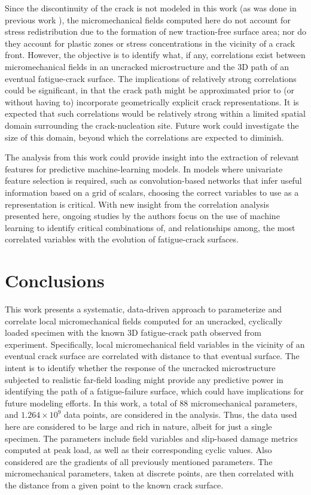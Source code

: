 Since the discontinuity of the crack is not modeled in this work (as was done in previous work \cite{spear2016}), the micromechanical fields computed here do not account for stress redistribution due to the formation of new traction-free surface area; nor do they account for plastic zones or stress concentrations in the vicinity of a crack front. However, the objective is to identify what, if any, correlations exist between micromechanical fields in an uncracked microstructure and the 3D path of an eventual fatigue-crack surface. The implications of relatively strong correlations could be significant, in that the crack path might be approximated prior to (or without having to) incorporate geometrically explicit crack representations. It is expected that such correlations would be relatively strong within a limited spatial domain surrounding the crack-nucleation site. Future work could investigate the size of this domain, beyond which the correlations are expected to diminish. 

The analysis from this work could provide insight into the extraction of relevant features for predictive machine-learning models. In models where univariate feature selection is required, such as convolution-based networks that infer useful information based on a grid of scalars, choosing the correct variables to use as a representation is critical. With new insight from the correlation analysis presented here, ongoing studies by the authors focus on the use of machine learning to identify critical combinations of, and relationships among, the most correlated variables with the evolution of fatigue-crack surfaces.

\section{Conclusions}
This work presents a systematic, data-driven approach to parameterize and correlate local micromechanical fields computed for an uncracked, cyclically loaded specimen with the known 3D fatigue-crack path observed from experiment. Specifically, local micromechanical field variables in the vicinity of an eventual crack surface are correlated with distance to that eventual surface. The intent is to identify whether the response of the uncracked microstructure subjected to realistic far-field loading might provide any predictive power in identifying the path of a fatigue-failure surface, which could have implications for future modeling efforts. In this work, a total of 88 micromechanical parameters, and $1.264\times 10^{9}$ data points, are considered in the analysis. Thus, the data used here are considered to be large and rich in nature, albeit for just a single specimen. The parameters include field variables and slip-based damage metrics computed at peak load, as well as their corresponding cyclic values. Also considered are the gradients of all previously mentioned parameters. The micromechanical parameters, taken at discrete points, are then correlated with the distance from a given point to the known crack surface. 

